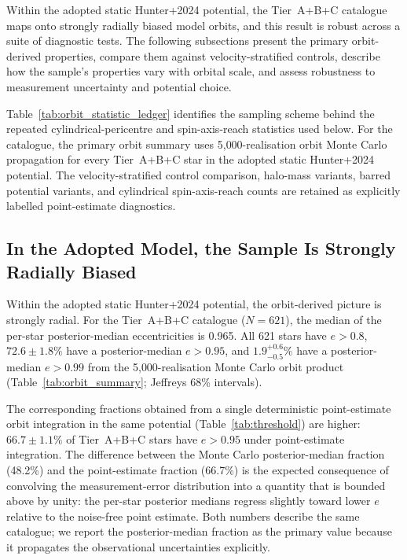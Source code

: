\documentclass{aa}  %
\begin{document}
Within the adopted static Hunter+2024 potential, the Tier~A+B+C
catalogue maps onto strongly radially biased model orbits, and this
result is robust across a suite of diagnostic tests.  The following
subsections present the primary orbit-derived properties, compare them
against velocity-stratified controls, describe how the sample's
properties vary with orbital scale, and assess robustness to measurement
uncertainty and potential choice.

Table~\ref{tab:orbit_statistic_ledger} identifies the sampling scheme
 behind the repeated cylindrical-pericentre and spin-axis-reach statistics used below.
For the catalogue, the primary orbit summary uses
5{,}000-realisation orbit Monte Carlo propagation for every Tier~A+B+C
star in the adopted static Hunter+2024 potential.  The
velocity-stratified control comparison, halo-mass variants, barred
 potential variants, and cylindrical spin-axis-reach counts are retained as explicitly
labelled point-estimate diagnostics.



\subsection{In the Adopted Model, the Sample Is Strongly Radially
  Biased} \label{sec:eccentricity}

Within the adopted static Hunter+2024 potential, the orbit-derived
picture is strongly radial.  For the Tier~A+B+C catalogue
($N=621$), the median of the per-star posterior-median
eccentricities is 0.965.  All 621 stars have $e>0.8$, $72.6\pm 1.8\%$
have a posterior-median $e>0.95$, and $1.9^{+0.6}_{-0.5}\%$ have a
posterior-median $e>0.99$ from the 5{,}000-realisation Monte Carlo orbit
product (Table~\ref{tab:orbit_summary}; Jeffreys 68\% intervals).

The corresponding fractions obtained from a single deterministic
point-estimate orbit integration in the same potential
(Table~\ref{tab:threshold}) are higher: $66.7\pm 1.1\%$ of Tier~A+B+C
stars have $e>0.95$ under point-estimate integration.  The difference
between the Monte Carlo posterior-median fraction (48.2\%) and the
point-estimate fraction (66.7\%) is the expected consequence of
convolving the measurement-error distribution into a quantity that is
bounded above by unity: the per-star posterior medians regress slightly
toward lower $e$ relative to the noise-free point estimate.  Both
numbers describe the same catalogue; we report the posterior-median
fraction as the primary value because it propagates the observational
uncertainties explicitly.
\end{document}
